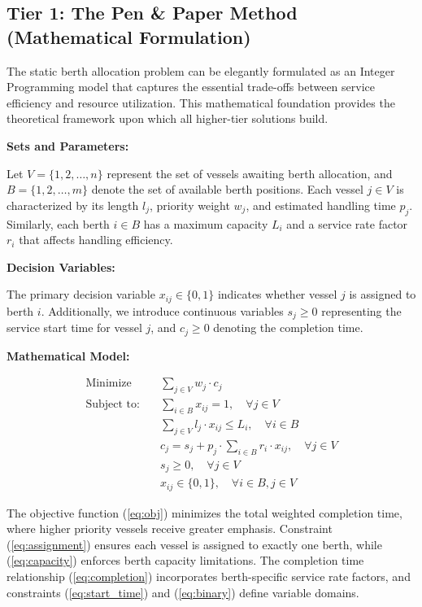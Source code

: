 \documentclass{article}
\begin{document}
\subsection{Tier 1: The Pen \& Paper Method (Mathematical Formulation)}

The static berth allocation problem can be elegantly formulated as an Integer Programming model that captures the essential trade-offs between service efficiency and resource utilization. This mathematical foundation provides the theoretical framework upon which all higher-tier solutions build.

\textbf{Sets and Parameters:}

Let $V = \{1, 2, \ldots, n\}$ represent the set of vessels awaiting berth allocation, and $B = \{1, 2, \ldots, m\}$ denote the set of available berth positions. Each vessel $j \in V$ is characterized by its length $l_j$, priority weight $w_j$, and estimated handling time $p_j$. Similarly, each berth $i \in B$ has a maximum capacity $L_i$ and a service rate factor $r_i$ that affects handling efficiency.

\textbf{Decision Variables:}

The primary decision variable $x_{ij} \in \{0, 1\}$ indicates whether vessel $j$ is assigned to berth $i$. Additionally, we introduce continuous variables $s_j \geq 0$ representing the service start time for vessel $j$, and $c_j \geq 0$ denoting the completion time.

\textbf{Mathematical Model:}

\begin{align}
\text{Minimize} \quad & \sum_{j \in V} w_j \cdot c_j \label{eq:obj}\\
\text{Subject to:} \quad & \sum_{i \in B} x_{ij} = 1, \quad \forall j \in V \label{eq:assignment}\\
& \sum_{j \in V} l_j \cdot x_{ij} \leq L_i, \quad \forall i \in B \label{eq:capacity}\\
& c_j = s_j + p_j \cdot \sum_{i \in B} r_i \cdot x_{ij}, \quad \forall j \in V \label{eq:completion}\\
& s_j \geq 0, \quad \forall j \in V \label{eq:start_time}\\
& x_{ij} \in \{0, 1\}, \quad \forall i \in B, j \in V \label{eq:binary}
\end{align}

The objective function (\ref{eq:obj}) minimizes the total weighted completion time, where higher priority vessels receive greater emphasis. Constraint (\ref{eq:assignment}) ensures each vessel is assigned to exactly one berth, while (\ref{eq:capacity}) enforces berth capacity limitations. The completion time relationship (\ref{eq:completion}) incorporates berth-specific service rate factors, and constraints (\ref{eq:start_time}) and (\ref{eq:binary}) define variable domains.
\end{document}
